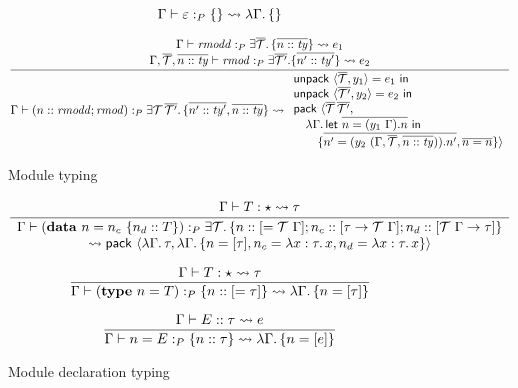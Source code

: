 \documentclass{article}
\begin{document}
\begin{figure}[H]

\[
\Gamma \vdash \varepsilon :_P \{ \} \leadsto{} \lambda\Gamma.\, \{\}
\]

\[
\frac{
\begin{array}{c}
\Gamma \vdash \mathit{rmodd} :_P \exists \overline{\mathcal{T}}.\, \{ \overline{n :: \mathit{ty}} \} \leadsto{} e_1 \\
\Gamma, \overline{\mathcal{T}}, \overline{n :: \mathit{ty}} \vdash \mathit{rmod} :_P \exists \overline{\mathcal{T}'}. \{ \overline{n' :: \mathit{ty}'} \} \leadsto{} e_2 \\
\end{array}
}{
\Gamma \vdash (n :: \mathit{rmodd} ; \mathit{rmod}) :_P \exists \mathcal{T}\, \overline{\mathcal{T}'}.\, \{ \overline{n' :: \mathit{ty}'}, \overline{n :: \mathit{ty}} \} \leadsto{} \begin{array}{l}
\textsf{unpack}~\langle \overline{\mathcal{T}}, y_1 \rangle = e_1~\textsf{in}\\
\textsf{unpack}~\langle \overline{\mathcal{T}'}, y_2 \rangle = e_2~\textsf{in}\\
\textsf{pack}~\langle \overline{\mathcal{T}}\, \overline{\mathcal{T}'},\\
\quad\lambda \Gamma.\, \textsf{let}~\overline{n = (y_1~\Gamma).n}~\textsf{in} \\
\quad\quad \{ \overline{n' = (y_2~(\Gamma, \overline{\mathcal{T}}, \overline{n :: \mathit{ty}})).n'}, \overline{n = n} \} \rangle
\end{array}
}
\]

\caption{Module typing}
\end{figure}

\begin{figure}[H]

\[
\frac{
\begin{array}{c}
\Gamma \vdash T : \star \leadsto \tau \\
\end{array}
}{
\begin{array}{c}
\Gamma \vdash (\mathbf{data}~n = n_c~\{ n_d :: T \})
    :_P
\exists \mathcal{T}.\,
\{ n :: [ = \mathcal{T}~\Gamma]; n_c :: [\tau \rightarrow \mathcal{T}~\Gamma]; n_d :: [\mathcal{T}~\Gamma \rightarrow \tau] \} \\
\leadsto{} 
\textsf{pack}~\langle
\lambda \Gamma.\, \tau,
\lambda \Gamma.\, \{n = [\tau], n_c = \lambda x : \tau.\, x, n_d = \lambda x : \tau.\, x\} \rangle

\end{array}
}
\]

\[
\frac{
\Gamma \vdash T : \star \leadsto \tau
}{
\Gamma \vdash (\mathbf{type}~n = T) :_P \{ n :: [ = \tau ] \}
\leadsto{} \lambda \Gamma.\, \{ n = [\tau] \}
}
\]

\[
\frac{
\Gamma \vdash E :: \tau \leadsto{} e
}{
\Gamma \vdash n = E :_P \{ n :: \tau \} \leadsto{} \lambda \Gamma.\, \{ n = [e] \}
}
\]
\caption{Module declaration typing}
\end{figure}
\end{document}
